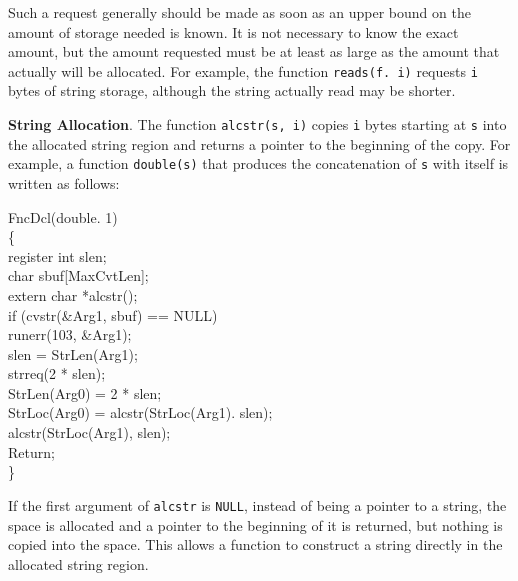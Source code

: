 Such a request generally should be made as soon as an upper bound on the
amount of storage needed is known. It is not necessary to know the exact
amount, but the amount requested must be at least as large as the amount
that actually will be allocated. For example, the function
\texttt{reads(f. i)} requests \texttt{i} bytes of string storage, although
the string actually read may be shorter.

\textbf{String Allocation}. The function \texttt{alcstr(s, i)} copies
\texttt{i} bytes starting at \texttt{s} into the allocated string region
and returns a pointer to the beginning of the copy. For example, a function
\texttt{double(s)} that produces the concatenation of \texttt{s} with
itself is written as follows:
\goodbreak
\begin{iconcode}
\color{red}FncDcl(double. 1)\\
\{\\
\>register int slen;\\
\>char sbuf[MaxCvtLen];\\
\>extern char *alcstr();\\
\>if (cvstr(\&Arg1, sbuf) == NULL)\\
\>\>runerr(103, \&Arg1);\\
\>slen = StrLen(Arg1);\\
\>strreq(2 * slen);\\
\>StrLen(Arg0) = 2 * slen;\\
\>StrLoc(Arg0) = alcstr(StrLoc(Arg1). slen);\\
\>alcstr(StrLoc(Arg1), slen);\\
\>Return;\\
\}
\end{iconcode}

If the first argument of \texttt{alcstr} is \texttt{NULL}, instead of being
a pointer to a string, the space is allocated and a pointer to the
beginning of it is returned, but nothing is copied into the space. This
allows a function to construct a string directly in the allocated string
region.

